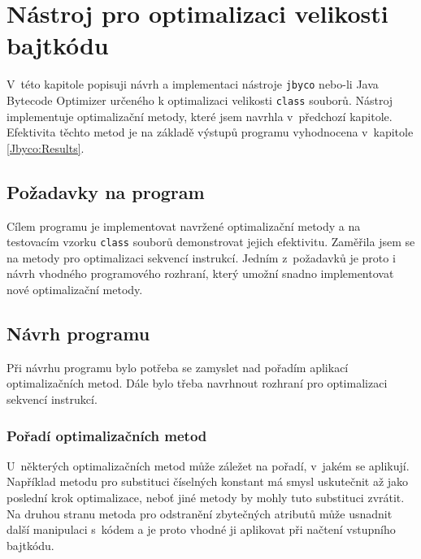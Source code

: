 \chapter{Nástroj pro optimalizaci velikosti bajtkódu}\label{Jbyco}


V~této kapitole popisuji návrh a implementaci nástroje \texttt{jbyco} nebo-li Java Bytecode Optimizer určeného k optimalizaci velikosti \texttt{class} souborů. Nástroj implementuje optimalizační metody, které jsem navrhla v~předchozí kapitole. Efektivita těchto metod je na základě výstupů programu vyhodnocena v~kapitole \ref{Jbyco:Results}.

\section{Požadavky na program}\label{Jbyco:Requirements}

Cílem programu je implementovat navržené optimalizační metody a na testovacím vzorku \texttt{class} souborů demonstrovat jejich efektivitu. Zaměřila jsem se na metody pro optimalizaci sekvencí instrukcí. Jedním z~požadavků je proto i návrh vhodného programového rozhraní, který umožní snadno implementovat nové optimalizační metody.

\section{Návrh programu}\label{Jbyco:Design}

Při návrhu programu bylo potřeba se zamyslet nad pořadím aplikací optimalizačních metod. Dále bylo třeba navrhnout rozhraní pro optimalizaci sekvencí instrukcí.

\subsection{Pořadí optimalizačních metod}

U~některých optimalizačních metod může záležet na pořadí, v~jakém se aplikují. Například metodu pro substituci číselných konstant má smysl uskutečnit až jako poslední krok optimalizace, neboť jiné metody by mohly tuto substituci zvrátit. Na druhou stranu metoda pro odstranění zbytečných atributů může usnadnit další manipulaci s~kódem a je proto vhodné ji aplikovat při načtení vstupního bajtkódu. 

